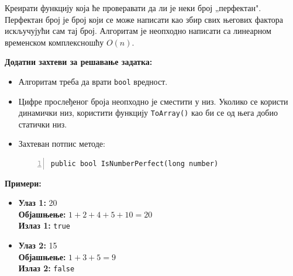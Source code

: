 Креирати функцију која ће проверавати да ли је неки број „перфектан". Перфектан број је број који се може написати као збир свих његових фактора искључујући сам тај број. Алгоритам је неопходно написати са линеарном временском комплексношћу $O(n)$.

\textbf{Додатни захтеви за решавање задатка:}
\begin{itemize}
    \item Алгоритам треба да врати \texttt{bool} вредност.
    \item Цифре прослеђеног броја неопходно је сместити у низ. Уколико се користи динамички низ, користити функцију \texttt{ToArray()} као би се од њега добио статички низ.
    \item Захтеван потпис методе:
    \begin{Verbatim}[fontsize=\footnotesize, numbers=left, xleftmargin=10mm]
public bool IsNumberPerfect(long number)
    \end{Verbatim}
\end{itemize}

\textbf{Примери:}
\begin{itemize}
    \item \textbf{Улаз 1:} 20 \\
          \textbf{Објашњење:} $1 + 2 + 4 + 5 + 10 = 20$ \\
          \textbf{Излаз 1:} \texttt{true}
    \item \textbf{Улаз 2:} 15 \\
          \textbf{Објашњење:} $1 + 3 + 5 = 9$ \\
          \textbf{Излаз 2:} \texttt{false}
\end{itemize}

